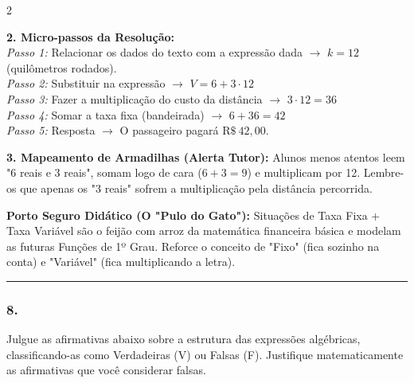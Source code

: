 \begin{multicols*}{2}
\begin{tcolorbox}[colback=CorTitUm!5, colframe=CorTitUm, boxrule=1pt, arc=4pt, left=6pt, right=6pt, top=6pt, bottom=6pt]
    \textbf{2. Micro-passos da Resolução:}\\
    \textit{Passo 1:} Relacionar os dados do texto com a expressão dada $\rightarrow$ $k = 12$ (quilômetros rodados).\\
    \textit{Passo 2:} Substituir na expressão $\rightarrow$ $ V = 6 + 3 \cdot 12 $\\
    \textit{Passo 3:} Fazer a multiplicação do custo da distância $\rightarrow$ $ 3 \cdot 12 = 36 $\\
    \textit{Passo 4:} Somar a taxa fixa (bandeirada) $\rightarrow$ $ 6 + 36 = 42 $\\
    \textit{Passo 5:} Resposta $\rightarrow$ O passageiro pagará $\text{R\$} \ 42,00$.\par\vspace{0.1cm}
    
    \textbf{3. Mapeamento de Armadilhas (Alerta Tutor):} Alunos menos atentos leem "6 reais e 3 reais", somam logo de cara ($6+3=9$) e multiplicam por 12. Lembre-os que apenas os "3 reais" sofrem a multiplicação pela distância percorrida.
    \end{tcolorbox}
    \vspace{0.15cm}
    
    \begin{boxexplicacao}
    \textbf{Porto Seguro Didático (O "Pulo do Gato"):} Situações de Taxa Fixa + Taxa Variável são o feijão com arroz da matemática financeira básica e modelam as futuras Funções de 1º Grau. Reforce o conceito de "Fixo" (fica sozinho na conta) e "Variável" (fica multiplicando a letra).
    \end{boxexplicacao}
\fi

\par\vspace{\espacoQuestao}

\noindent\textcolor{CorLinha}{\rule{\linewidth}{0.5pt}} 
\par\vspace{\espacoPreQuestao}
\subsubsection*{8.} 
\begin{enunciadoLiteral}
Julgue as afirmativas abaixo sobre a estrutura das expressões algébricas, classificando-as como Verdadeiras (V) ou Falsas (F). Justifique matematicamente as afirmativas que você considerar falsas.


\end{enunciadoLiteral}
\end{multicols*}
